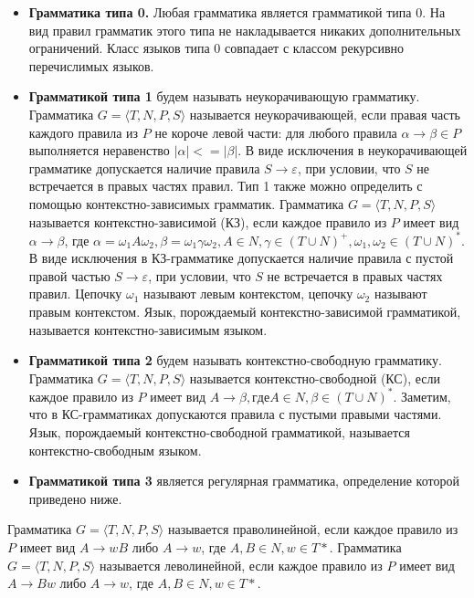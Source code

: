 \begin{itemize}
    \item \textbf{Грамматика типа 0.} Любая грамматика является грамматикой типа 0. На вид правил грамматик этого типа не накладывается никаких дополнительных ограничений. Класс языков типа 0 совпадает с классом рекурсивно перечислимых языков.
    
    \item \textbf{Грамматикой типа 1} будем называть неукорачивающую грамматику. Грамматика $G = \langle T, N, P, S \rangle$ называется неукорачивающей, если правая часть каждого правила из $P$ не короче левой части: для любого правила $\alpha \rightarrow \beta \in P$ выполняется неравенство $| \alpha | <= | \beta |$. В виде исключения в неукорачивающей грамматике допускается наличие правила $S \rightarrow \varepsilon$, при условии, что $S$ не встречается в правых частях правил. Тип 1 также можно определить с помощью контекстно-зависимых грамматик. Грамматика $G = \langle T, N, P, S \rangle$ называется контекстно-зависимой (КЗ), если каждое правило из $P$ имеет вид $\alpha \rightarrow \beta$, где $\alpha = \omega_1 A\omega_2, \beta = \omega_1\gamma\omega_2, A \in N, \gamma \in (T \cup N )^+   , \omega_1, \omega_2 \in (T \cup N)^*$. В виде исключения в КЗ-грамматике допускается наличие правила с пустой правой частью $S \rightarrow \varepsilon$, при условии, что $S$ не встречается в правых частях правил. Цепочку $\omega_1$ называют левым контекстом, цепочку $\omega_2$ называют правым контекстом. Язык, порождаемый контекстно-зависимой грамматикой, называется контекстно-зависимым языком. 
    
    \item \textbf{Грамматикой типа 2} будем называть контекстно-свободную грамматику. Грамматика $G = \langle T, N, P, S \rangle$ называется контекстно-свободной (КС), если каждое правило из $P$ имеет вид $A \rightarrow \beta, где A \in N, \beta \in ( T \cup N )^*$. Заметим, что в КС-грамматиках допускаются правила с пустыми правыми частями.  Язык, порождаемый контекстно-свободной грамматикой, называется контекстно-свободным языком. 

    \item \textbf{Грамматикой типа 3} является регулярная грамматика, определение которой приведено ниже.
     
\end{itemize}

Грамматика $G = \langle T, N, P, S \rangle$ называется праволинейной, если каждое правило из $P$ имеет вид $A \rightarrow wB$ либо $A \rightarrow w$, где $A, B \in N, w \in T*$. Грамматика $G = \langle T, N, P, S \rangle$ называется леволинейной, если каждое правило из $P$ имеет вид $A \rightarrow Bw$ либо $A \rightarrow w$, где $A, B \in N, w \in T*$. 

